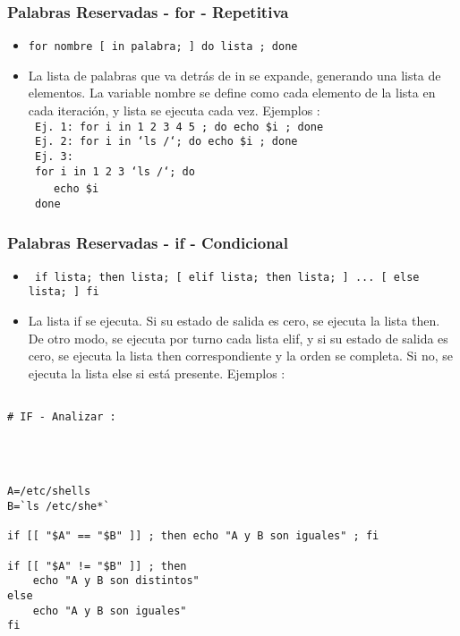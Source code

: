 \documentclass{beamer}
\begin{document}
\begin{frame}
\frametitle{Palabras Reservadas - for - Repetitiva}
 \begin{itemize}
\item \texttt{for nombre [ in palabra; ] do lista ; done}

\item La lista de palabras que va detrás de in se  expande,  generando
              una  lista  de elementos. La variable nombre se define como cada
              elemento de la lista en cada iteración, y lista se ejecuta  cada
              vez. Ejemplos :\\


\texttt{       Ej. 1: for i in 1 2 3 4 5 ; do echo \$i ; done}\\
\texttt{       Ej. 2: for i in `ls /`; do echo \$i ; done}\\
\texttt{       Ej. 3: }\\
\texttt{       for i in 1 2 3 `ls /`; do }\\ \ \ \
\texttt{           echo \$i}\\
\texttt{       done}

\end{itemize}
\end{frame}

\begin{frame}
\frametitle{Palabras Reservadas - if - Condicional}
 \begin{itemize}
\item \texttt{ if  lista;  then lista; [ elif lista; then lista; ] ... [ else lista; ] fi }
\item 
              La lista if se ejecuta. Si su estado de salida es cero, se  ejecuta  la  lista  then.  De  otro modo, se ejecuta por turno cada
              lista elif, y si su estado de salida  es  cero,  se  ejecuta  la
              lista  then  correspondiente  y  la orden se completa. Si no, se
              ejecuta la lista else si está presente. Ejemplos :\\

\end{itemize}
\end{frame}

\begin{Verbatim}

# IF - Analizar :




A=/etc/shells
B=`ls /etc/she*`

if [[ "$A" == "$B" ]] ; then echo "A y B son iguales" ; fi

if [[ "$A" != "$B" ]] ; then
	echo "A y B son distintos"
else
	echo "A y B son iguales"
fi

\end{Verbatim}
\end{document}
